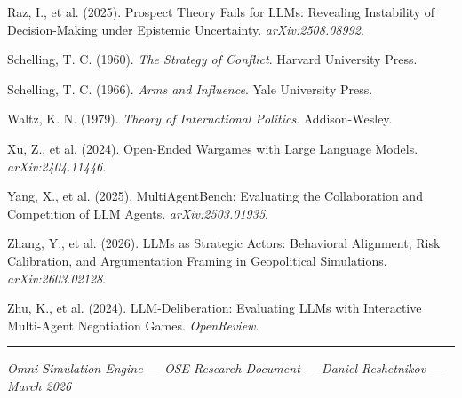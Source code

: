 \documentclass[12pt, a4paper]{article}
\begin{document}
\begin{enumerate}[leftmargin=1.5em, label={[\arabic*]}]
    \item Raz, I., et al. (2025). Prospect Theory Fails for LLMs: Revealing Instability of Decision-Making under Epistemic Uncertainty. \textit{arXiv:2508.08992}.

    \item Schelling, T. C. (1960). \textit{The Strategy of Conflict}. Harvard University Press.

    \item Schelling, T. C. (1966). \textit{Arms and Influence}. Yale University Press.

    \item Waltz, K. N. (1979). \textit{Theory of International Politics}. Addison-Wesley.

    \item Xu, Z., et al. (2024). Open-Ended Wargames with Large Language Models. \textit{arXiv:2404.11446}.

    \item Yang, X., et al. (2025). MultiAgentBench: Evaluating the Collaboration and Competition of LLM Agents. \textit{arXiv:2503.01935}.

    \item Zhang, Y., et al. (2026). LLMs as Strategic Actors: Behavioral Alignment, Risk Calibration, and Argumentation Framing in Geopolitical Simulations. \textit{arXiv:2603.02128}.

    \item Zhu, K., et al. (2024). LLM-Deliberation: Evaluating LLMs with Interactive Multi-Agent Negotiation Games. \textit{OpenReview}.
\end{enumerate}

\vspace{2cm}
\hrule
\vspace{0.5cm}
{\small \textit{Omni-Simulation Engine --- OSE Research Document --- Daniel Reshetnikov --- March 2026}}
\end{document}
